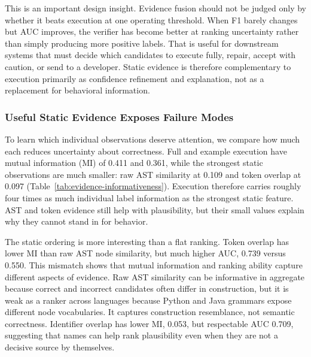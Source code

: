 ﻿\documentclass[conference]{IEEEtran}
\begin{document}
This is an important design insight. Evidence fusion should not be judged only by whether it beats execution at one operating threshold. When F1 barely changes but AUC improves, the verifier has become better at ranking uncertainty rather than simply producing more positive labels. That is useful for downstream systems that must decide which candidates to execute fully, repair, accept with caution, or send to a developer. Static evidence is therefore complementary to execution primarily as confidence refinement and explanation, not as a replacement for behavioral information.

\FloatBarrier

\subsubsection{Useful Static Evidence Exposes Failure Modes}
To learn which individual observations deserve attention, we compare how much each reduces uncertainty about correctness. Full and example execution have mutual information (MI) of 0.411 and 0.361, while the strongest static observations are much smaller: raw AST similarity at 0.109 and token overlap at 0.097 (Table~\ref{tab:evidence-informativeness}). Execution therefore carries roughly four times as much individual label information as the strongest static feature. AST and token evidence still help with plausibility, but their small values explain why they cannot stand in for behavior.

The static ordering is more interesting than a flat ranking. Token overlap has lower MI than raw AST node similarity, but much higher AUC, 0.739 versus 0.550. This mismatch shows that mutual information and ranking ability capture different aspects of evidence. Raw AST similarity can be informative in aggregate because correct and incorrect candidates often differ in construction, but it is weak as a ranker across languages because Python and Java grammars expose different node vocabularies. It captures construction resemblance, not semantic correctness. Identifier overlap has lower MI, 0.053, but respectable AUC 0.709, suggesting that names can help rank plausibility even when they are not a decisive source by themselves.
\end{document}
